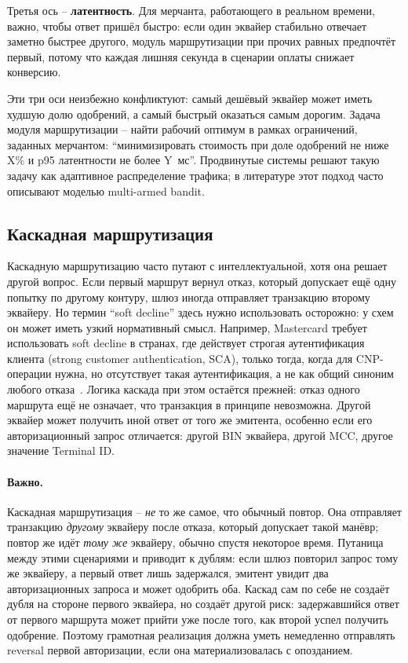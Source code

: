Третья ось -- \textbf{латентность}. Для мерчанта, работающего
в реальном времени, важно, чтобы ответ пришёл быстро: если
один эквайер стабильно отвечает заметно быстрее другого,
модуль маршрутизации при прочих равных предпочтёт первый,
потому что каждая лишняя секунда в сценарии оплаты
снижает конверсию.

Эти три оси неизбежно конфликтуют: самый дешёвый эквайер
может иметь худшую долю одобрений, а самый быстрый оказаться
самым дорогим. Задача модуля маршрутизации -- найти рабочий
оптимум в рамках ограничений, заданных мерчантом: \enquote{минимизировать
стоимость при доле одобрений не ниже X\% и p95 латентности
не более Y~мс}. Продвинутые системы решают такую задачу
как адаптивное распределение трафика; в литературе этот подход
часто описывают моделью multi-armed bandit.

\subsection*{Каскадная маршрутизация}

Каскадную маршрутизацию часто путают с интеллектуальной, хотя
она решает другой вопрос. Если первый маршрут вернул отказ,
который допускает ещё одну попытку по другому контуру, шлюз
иногда отправляет транзакцию второму эквайеру. Но термин
\enquote{soft decline} здесь нужно использовать осторожно:
у схем он может иметь узкий нормативный смысл. Например,
Mastercard требует использовать soft decline
в странах, где действует строгая аутентификация клиента
(strong customer authentication, SCA), только тогда, когда
для CNP-операции нужна, но отсутствует такая аутентификация,
а не как
общий синоним любого отказа~\cite{mc-tpr}. Логика каскада
при этом остаётся прежней: отказ одного маршрута ещё не
означает, что транзакция в принципе невозможна. Другой
эквайер может получить иной ответ от того же эмитента,
особенно если его авторизационный запрос отличается:
другой BIN эквайера, другой MCC, другое значение
Terminal ID.

\paragraph{Важно.}
  Каскадная маршрутизация -- \emph{не} то же самое, что обычный
  повтор. Она отправляет транзакцию \emph{другому} эквайеру
  после отказа, который допускает такой манёвр; повтор же
  идёт \emph{тому же} эквайеру, обычно спустя некоторое время.
  Путаница между этими сценариями и приводит к дублям: если
  шлюз повторил запрос тому же эквайеру, а первый ответ лишь задержался,
  эмитент увидит два авторизационных запроса и может одобрить
  оба. Каскад сам по себе не создаёт дубля на стороне первого
  эквайера, но создаёт другой риск: задержавшийся ответ от
  первого маршрута может прийти уже после того, как второй
  успел получить одобрение. Поэтому грамотная реализация должна
  уметь немедленно отправлять reversal первой авторизации,
  если она материализовалась с опозданием.


